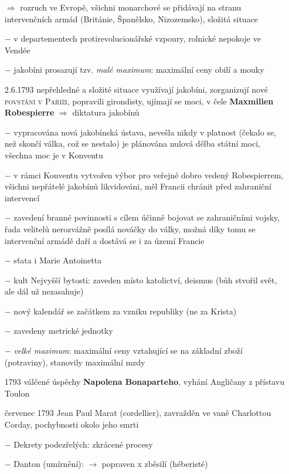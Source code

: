 \documentclass{article}
\begin{document}
\begin{itemize}
    \vspace{-0.5em}
    \setlength\itemsep{0.15em}


    \item[$\Rightarrow$] rozruch ve Evropě, všichni monarchové se přidávají na stranu intervenčních armád (Británie, Španělsko, Nizozemsko), složitá situace
    \item[$-$] v departementech protirevolucionářské vzpoury, rolnické nepokoje ve Vendée
    \item[$-$] jakobíni prosazují tzv. \textit{malé maximum}: maximální ceny obilí a mouky
    \item[2.6.1793] nepřehledné a složité situace využívají jakobíni, zorganizují nové \textsc{povstání v Paříži}, popravili girondisty, ujímají se moci, v čele \textbf{Maxmilien Robespierre} $\Rightarrow$  diktatura jakobínů
    \item[$-$] vypracována nová jakobínská ústava, nevešla nikdy v platnost (čekalo se, než skončí válka, což se nestalo) je plánována nulová dělba státní moci, všechna moc je v Konventu
    \item[$-$] v rámci Konventu vytvořen výbor pro veřejné dobro vedený Robespierrem, všichni nepřátelé jakobínů likvidováni, měl Francii chránit před zahraniční intervencí
    \item[$-$] zavedení branné povinnosti s cílem účinně bojovat se zahraničními vojsky, řada velitelů nerozvážně posílá nováčky do války, možná díky tomu se intervenční armádě daří a dostává se i za území Francie
    \item[$-$] sťata i Marie Antoinetta
    \item[$-$] kult Nejvyšší bytosti: zaveden místo katolictví, deismus (bůh stvořil svět, ale dál už nezasahuje)
    \item[$-$] nový kalendář se začátkem za vzniku republiky (ne za Krista)
    \item[$-$] zavedeny metrické jednotky
    \item[$-$] \textit{velké maximum}: maximální ceny vztahující se na základní zboží (potraviny), stanovily maximální mzdy
    \item[1793] válčené úspěchy \textbf{Napolena Bonaparteho}, vyhání Angličany z přístavu Toulon
    \item[červenec 1793]  Jean Paul Marat (cordellier), zavražděn ve vaně Charlottou Corday, pochybnosti okolo jeho smrti
    \item[$-$] Dekrety podezřelých: zkrácené procesy
    \item[$-$] Danton (umírnění):  $\rightarrow$ popraven x zběsilí (héberisté)

\end{itemize}
\end{document}
